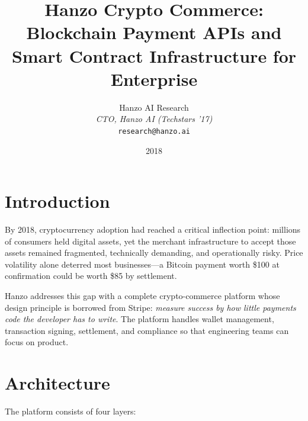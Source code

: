 \documentclass[11pt,twocolumn]{article}
\title{Hanzo Crypto Commerce: Blockchain Payment APIs and Smart Contract
Infrastructure for Enterprise}
\author{
    Hanzo AI Research \\
    \textit{CTO, Hanzo AI (Techstars '17)} \\
    \texttt{research@hanzo.ai}
}
\date{2018}
\begin{document}
\hanzocoverpage


\section{Introduction}
\label{sec:intro}

By 2018, cryptocurrency adoption had reached a critical inflection point:
millions of consumers held digital assets, yet the merchant infrastructure to
accept those assets remained fragmented, technically demanding, and
operationally risky. Price volatility alone deterred most businesses---a Bitcoin
payment worth \$100 at confirmation could be worth \$85 by settlement.

Hanzo addresses this gap with a complete crypto-commerce platform whose design
principle is borrowed from Stripe: \emph{measure success by how little payments
code the developer has to write}. The platform handles wallet management,
transaction signing, settlement, and compliance so that engineering teams can
focus on product.

\section{Architecture}
\label{sec:architecture}

The platform consists of four layers:
\end{document}
